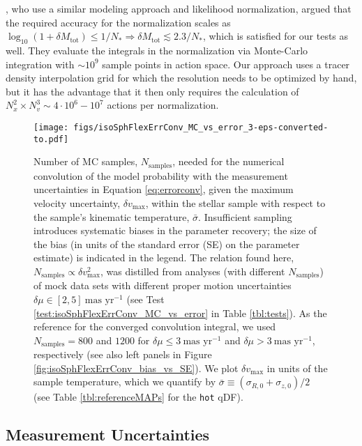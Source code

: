 \documentclass[iop,revtex4,numberedappendix,appendixfloats]{emulateapj}
\begin{document}
\citet{2013MNRAS.433.1411M}, who use a similar modeling approach and likelihood normalization, argued that the required accuracy for the normalization scales as $\log_{10} \left(1+\delta M_\text{tot} \right) \leq 1 / N_* \Rightarrow \delta M_\text{tot} \lesssim 2.3/N_*$, which is satisfied for our tests as well. They evaluate the integrals in the normalization via Monte-Carlo integration with $\sim 10^9$ sample points in action space. Our approach uses a tracer density interpolation grid for which the resolution needs to be optimized by hand, but it has the advantage that it then only requires the calculation of $N_x^2 \times N_v^3 \sim 4\cdot 10^{6} - 10^7$ actions per normalization.

\begin{figure}[!htbp]
\centering
\texttt{[image: figs/isoSphFlexErrConv\_MC\_vs\_error\_3-eps-converted-to.pdf]}
\caption{Number of MC samples, $N_\text{samples}$, needed for the numerical convolution of the model probability with the measurement uncertainties in Equation \eqref{eq:errorconv}, given the maximum velocity uncertainty, $\delta v_\text{max}$, within the stellar sample with respect to the sample's kinematic temperature, $\bar{\sigma}$. Insufficient sampling introduces systematic biases in the parameter recovery; the size of the bias (in units of the standard error (SE) on the parameter estimate) is indicated in the legend. The relation found here, $N_\text{samples} \propto \delta v_\text{max}^2$, was distilled from analyses (with different $N_\text{samples}$) of mock data sets with different proper motion uncertainties $\delta \mu \in [2,5]~\text{mas yr}^{-1}$ (see Test \ref{test:isoSphFlexErrConv_MC_vs_error} in Table \ref{tbl:tests}). As the reference for the converged convolution integral, we used $N_\text{samples} = 800$ and $1200$ for $\delta \mu \leq 3~\text{mas yr}^{-1}$ and $\delta \mu > 3~\text{mas yr}^{-1}$, respectively (see also left panels in Figure \ref{fig:isoSphFlexErrConv_bias_vs_SE}). We plot $\delta v_\text{max}$ in units of the sample temperature, which we quantify by $\bar{\sigma} \equiv (\sigma_{R,0} + \sigma_{z,0})/2$ (see Table \ref{tbl:referenceMAPs} for the \texttt{hot} qDF).}
\label{fig:isoSphFlexErrConv_MC_vs_error}
\end{figure}

\subsection{Measurement Uncertainties}
\end{document}
